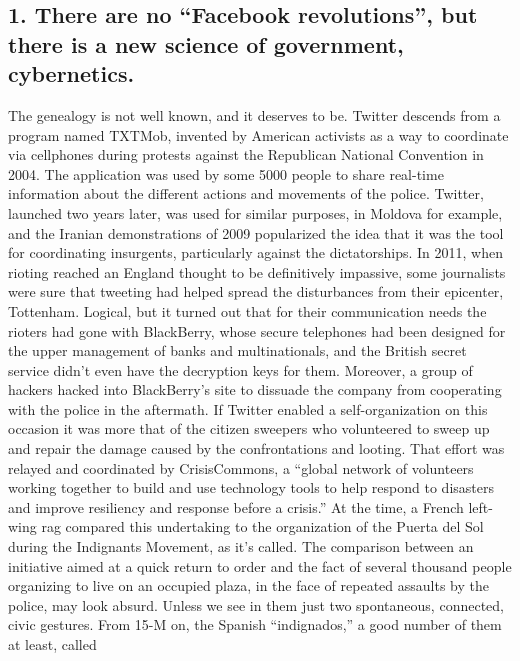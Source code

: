 \documentclass[landscape,twocolumn,letterpaper]{article}
\begin{document}
\vspace{10 mm}

\subsection*{1. There are no “Facebook
revolutions”, but there is a new science of
government, cybernetics.}
\vspace{5 mm}

\raggedright

The genealogy is not well known, and it deserves to be. Twitter
descends from a program named TXTMob, invented by American activists
as a way to coordinate via cellphones during protests against the
Republican National Convention in 2004. The application was used by
some 5000 people to share real-time information about the different
actions and movements of the police. Twitter, launched two years
later, was used for similar purposes, in Moldova for example, and the
Iranian demonstrations of 2009 popularized the idea that it was the
tool for coordinating insurgents, particularly against the
dictatorships. In 2011, when rioting reached an England thought to be
definitively impassive, some journalists were sure that tweeting had
helped spread the disturbances from their epicenter,
Tottenham. Logical, but it turned out that for their communication
needs the rioters had gone with BlackBerry, whose secure telephones
had been designed for the upper management of banks and
multinationals, and the British secret service didn’t even have the
decryption keys for them. Moreover, a group of hackers hacked into
BlackBerry’s site to dissuade the company from cooperating with the
police in the aftermath. If Twitter enabled a self-organization on
this occasion it was more that of the citizen sweepers who volunteered
to sweep up and repair the damage caused by the confrontations and
looting. That effort was relayed and coordinated by CrisisCommons, a
“global network of volunteers working together to build and use
technology tools to help respond to disasters and improve resiliency
and response before a crisis.” At the time, a French left-wing rag
compared this undertaking to the organization of the Puerta del Sol
during the Indignants Movement, as it’s called. The comparison between
an initiative aimed at a quick return to order and the fact of several
thousand people organizing to live on an occupied plaza, in the face
of repeated assaults by the police, may look absurd. Unless we see in
them just two spontaneous, connected, civic gestures. From 15-M on,
the Spanish “indignados,” a good number of them at least, called
\end{document}
